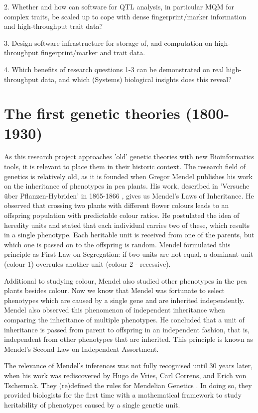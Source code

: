 2. Whether and how can software for QTL analysis, in particular MQM for complex traits, be scaled up to cope with dense fingerprint/marker information and high-throughput trait data?

3. Design software infrastructure for storage of, and computation on high-throughput fingerprint/marker and trait data.

4. Which benefits of research questions 1-3 can be demonstrated on real high-throughput data, and which (Systems) biological insights does this reveal? 

\section{The first genetic theories (1800-1930)}
As this research project approaches 'old' genetic theories with new Bioinformatics tools, it is relevant to place 
them in their historic context. The research field of genetics is relatively old, as it is founded when Gregor 
Mendel publishes his work on the inheritance of phenotypes in pea plants. His work, described in 'Versuche \"uber 
Pflanzen-Hybriden' in 1865-1866 \cite{Mendel:1866}, gives us Mendel's Laws of Inheritance. He observed that crossing 
two plants with different flower colours leads to an offspring population with predictable colour ratios. He 
postulated the idea of heredity units and stated that each individual carries two of these, which results in a 
single phenotype. Each heritable unit is received from one of the parents, but which one is passed on to the 
offspring is random. Mendel formulated this principle as First Law on Segregation: if two units are not equal, 
a dominant unit (colour 1) overrules another unit (colour 2 - recessive). 

Additional to studying colour, Mendel also studied other phenotypes in the pea plants besides colour. Now we know 
that Mendel was fortunate to select phenotypes which are caused by a single gene and are inherited independently. 
Mendel also observed this phenomenon of independent inheritance when comparing the inheritance of multiple 
phenotypes. He concluded that a unit of inheritance is passed from parent to offspring in an independent fashion, 
that is, independent  from other phenotypes that are inherited. This principle is known as Mendel's Second Law 
on Independent Assortment.

The relevance of Mendel's inferences was not fully recognised until 30 years later, when his work was rediscovered 
by Hugo de Vries, Carl Correns, and Erich von Tschermak. They (re)defined the rules for Mendelian Genetics \cite{deVries:1889}. 
In doing so, they provided biologists for the first time with a mathematical framework to study heritability of 
phenotypes caused by a single genetic unit.


